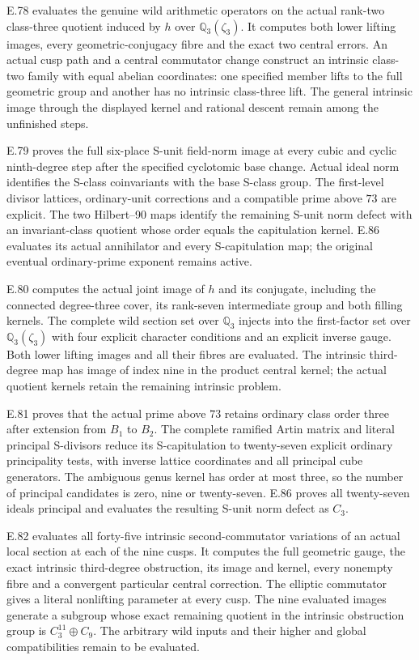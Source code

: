 E.78 evaluates the genuine wild arithmetic operators on the actual
rank-two class-three quotient induced by $h$ over
$\mathbb Q_3(\zeta_3)$. It computes both lower lifting images,
every geometric-conjugacy fibre and the exact two central errors.
An actual cusp path and a central commutator change construct an
intrinsic class-two family with equal abelian coordinates: one
specified member lifts to the full geometric group and another
has no intrinsic class-three lift. The general intrinsic image
through the displayed kernel and rational descent remain among
the unfinished steps.

E.79 proves the full six-place S-unit field-norm image at every
cubic and cyclic ninth-degree step after the specified cyclotomic
base change. Actual ideal norm identifies the S-class coinvariants
with the base S-class group. The first-level divisor lattices,
ordinary-unit corrections and a compatible prime above $73$ are
explicit. The two Hilbert--90 maps identify the remaining S-unit
norm defect with an invariant-class quotient whose order equals
the capitulation kernel. E.86 evaluates its actual annihilator and every S-capitulation
map; the original eventual ordinary-prime exponent remains active.

E.80 computes the actual joint image of $h$ and its conjugate,
including the connected degree-three cover, its rank-seven
intermediate group and both filling kernels. The complete wild
section set over $\mathbb Q_3$ injects into the first-factor set over
$\mathbb Q_3(\zeta_3)$ with four explicit character conditions and
an explicit inverse gauge. Both lower lifting images and all their
fibres are evaluated. The intrinsic third-degree map has image of
index nine in the product central kernel; the actual quotient
kernels retain the remaining intrinsic problem.

E.81 proves that the actual prime above $73$ retains ordinary
class order three after extension from $B_1$ to $B_2$.
The complete ramified Artin matrix and literal principal
S-divisors reduce its S-capitulation to twenty-seven explicit
ordinary principality tests, with inverse lattice coordinates
and all principal cube generators. The ambiguous genus kernel
has order at most three, so the number of principal candidates
is zero, nine or twenty-seven. E.86 proves all twenty-seven ideals principal and evaluates
the resulting S-unit norm defect as $C_3$.

E.82 evaluates all forty-five intrinsic second-commutator
variations of an actual local section at each of the nine cusps.
It computes the full geometric gauge, the exact intrinsic
third-degree obstruction, its image and kernel, every nonempty
fibre and a convergent particular central correction. The
elliptic commutator gives a literal nonlifting parameter at
every cusp. The nine evaluated images generate a subgroup
whose exact remaining quotient in the intrinsic obstruction
group is $C_3^{11}\oplus C_9$. The arbitrary wild inputs
and their higher and global compatibilities remain to be evaluated.

